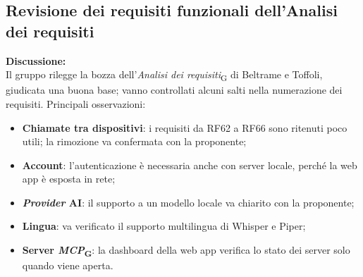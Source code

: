 \documentclass[12pt,a4paper]{article}
\newcommand{\gl}[1]{\emph{#1}\textsubscript{\scriptsize G}}       %
\newcommand{\tightlist}{\setlength{\itemsep}{1pt}\setlength{\parskip}{0pt}}
\begin{document}
\hypertarget{odg-1}{%
\subsection{Revisione dei requisiti funzionali dell'Analisi dei requisiti}}
\textbf{Discussione:}\\
Il gruppo rilegge la bozza dell'\gl{Analisi dei requisiti} di Beltrame e Toffoli, giudicata una buona base; vanno controllati alcuni salti nella numerazione dei requisiti. Principali osservazioni:
\begin{itemize}
\tightlist
\item \textbf{Chiamate tra dispositivi}: i requisiti da RF62 a RF66 sono ritenuti poco utili; la rimozione va confermata con la proponente;
\item \textbf{Account}: l'autenticazione è necessaria anche con server locale, perché la web app è esposta in rete;
\item \textbf{\emph{Provider} AI}: il supporto a un modello locale va chiarito con la proponente;
\item \textbf{Lingua}: va verificato il supporto multilingua di Whisper e Piper;
\item \textbf{Server \gl{MCP}}: la dashboard della web app verifica lo stato dei server solo quando viene aperta.
\end{itemize}
\end{document}
